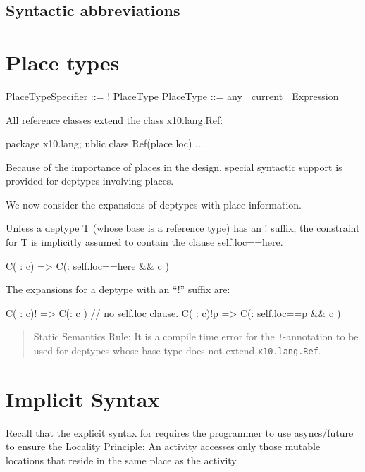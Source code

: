 \subsection{Syntactic abbreviations}\label{DepType:SyntaxAbbrev}

\section{Place types}\label{DepType:PlaceType}

\begin{x10}
PlaceTypeSpecifier ::= ! PlaceType
PlaceType ::=  any | current | Expression  
\end{x10}

All \Xten{} reference classes extend the class x10.lang.Ref:

\begin{x10}
package x10.lang;
ublic class Ref(place loc) { ... }  
\end{x10}

Because of the importance of places in the \Xten{} design, special
syntactic support is provided for deptypes involving places.

We now consider the expansions of deptypes with place information.

Unless a deptype {\cf T} (whose base is a reference type) has an {\cf !} suffix,
the constraint for {\cf T} is implicitly assumed to contain the clause
{\cf self.loc==here}.
\begin{x10}
C( : c) => C(: self.loc==here \&\& c )  
\end{x10}
\noindent The expansions for a deptype with an ``{\cf !}'' suffix are:
\begin{x10}
C( : c)!  => C(: c )  // no self.loc clause.
C( : c)!p => C(: self.loc==p \&\& c ) 
\end{x10}


\begin{quotation}
  {\cf Static Semantics Rule:} It is a compile time error for the {\tt !}-annotation to
  be used for deptypes whose base type does not extend {\tt x10.lang.Ref}.  
\end{quotation}

\section{Implicit Syntax}\label{ImplicitSyntax}

Recall that the explicit syntax for \Xten{} requires the programmer to use
asyncs/future to ensure the Locality Principle: An activity accesses
only those mutable locations that reside in the same place as the
activity. 

